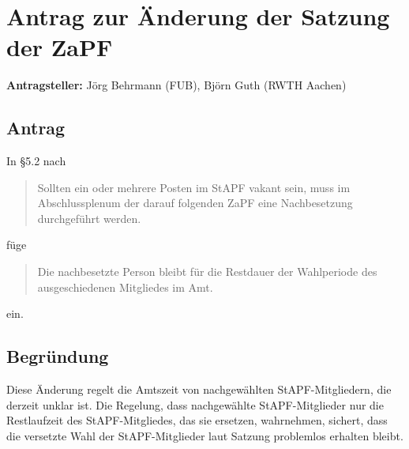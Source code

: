 \documentclass[a4,12pt,oneside]{scrartcl}
\begin{document}
\section*{Antrag zur Änderung der Satzung der ZaPF}

\textbf{Antragsteller:} Jörg Behrmann (FUB), Björn Guth (RWTH Aachen)

\subsection*{Antrag}

In §5.2 nach
\begin{quote}
	Sollten ein oder mehrere Posten im StAPF vakant sein, muss im Abschlussplenum der darauf folgenden ZaPF eine Nachbesetzung durchgeführt werden.
\end{quote}
füge
\begin{quote}
	Die nachbesetzte Person bleibt für die Restdauer der Wahlperiode des ausgeschiedenen Mitgliedes im Amt.
\end{quote}
ein.

\subsection*{Begründung}

Diese Änderung regelt die Amtszeit von nachgewählten StAPF-Mitgliedern, die
derzeit unklar ist.
Die Regelung, dass nachgewählte StAPF-Mitglieder nur die Restlaufzeit des
StAPF-Mitgliedes, das sie ersetzen, wahrnehmen, sichert, dass die versetzte Wahl
der StAPF-Mitglieder laut Satzung problemlos erhalten bleibt.
\end{document}
